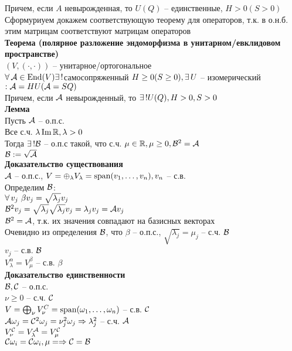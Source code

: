 \documentclass[12pt]{article}
\begin{document}
Причем, если $A$ невырожденная, то $U(Q)$ -- единственные, $H>0(S>0)$\\
Сформуриуем докажем соответствующую теорему для операторов, т.к. в о.н.б. этим матрицам соответствуют матрицам операторов\\
\textbf{Теорема (полярное разложение эндоморфизма в унитарном/евклидовом пространстве)}\\
$(V, (\cdot, \cdot))$ -- унитарное/ортогональное\\
$\forall\, \mathcal{A} \in \operatorname{End}(V) \exists\,! $самосопряженный $H \geq 0(S\geq 0), \exists\, U$ -- изомерический $: \mathcal{A} = HU (\mathcal{A} = SQ)$\\
Причем, если $\mathcal{A}$ невырожденный, то $\exists\,! U(Q), H > 0, S > 0$\\
\textbf{Лемма}\\
Пусть $\mathcal{A}$ -- о.п.с.\\
Все с.ч. $\lambda \operatorname{Im} \mathbb{R}, \lambda > 0$\\
Тогда $\exists\,! \mathcal{B}$ -- о.п.с такой, что с.ч. $\mu \in \mathbb{R}, \mu \geq 0, \mathcal{B}^2 = \mathcal{A}$\\
$\mathcal{B} := \sqrt{\mathcal{A}}$\\
\textbf{Доказательство существования}\\
$\mathcal{A}$ -- о.п.с., $V = \oplus_{\lambda} V_\lambda = \operatorname{span}(v_1, \ldots, v_n), v_n$ -- с.в.\\
Определим $\mathcal{B}$:\\
$\forall\, v_j\ \beta v_j = \sqrt{\lambda_j} v_j$\\
$\mathcal{B}^2 v_j = \sqrt{\lambda_j} \sqrt{\lambda_j} v_j = \lambda_j v_j = \mathcal{A} v_j$\\
$\mathcal{B}^2 = \mathcal{A}$, т.к. их значения совпадают на базисных векторах\\
Очевидно из определения $\mathcal{B}$, что $\beta$ -- о.п.с., $\sqrt{\lambda_j} = \mu_j$ -- с.ч. $\mathcal{B}$\\
$v_j$ -- с.в. $\mathcal{B}$\\
$V_\lambda^\alpha = V_\mu^\beta$ -- с.в. $\beta$\\
\textbf{Доказательство единственности}\\
$\mathcal{B}, \mathcal{C}$ -- о.п.с.\\
$\nu \geq 0$ -- с.ч. $\mathcal{C}$\\
$V = \bigoplus_{\nu}V_\nu^C = \operatorname{span}(\omega_1, \ldots, \omega_n)$ -- с.в. $\mathcal{C}$\\
$\mathcal{A}\omega_j = \mathcal{C}^2 \omega_j = \nu^2_j \omega_j \Rightarrow \lambda_j^2$ -- с.ч. $\mathcal{A}$\\
$V_\nu^\mathcal{C} = V_\lambda^\mathcal{A} = V_\mu^\mathcal{C}$\\
$\mathcal{C} \omega_i = \mathcal{C}\omega_i, \mu =  \Rightarrow \mathcal{C} = \mathcal{B}$\\
\end{document}
